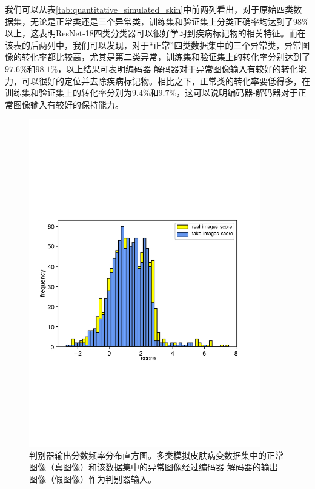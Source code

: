 我们可以从表\ref{tab:quantitative_simulated_skin}中前两列看出，对于原始四类数据集，无论是正常类还是三个异常类，训练集和验证集上分类正确率均达到了$98\%$以上，这表明ResNet-18四类分类器可以很好学习到疾病标记物的相关特征。而在该表的后两列中，我们可以发现，对于“正常”四类数据集中的三个异常类，异常图像的转化率都比较高，尤其是第二类异常，训练集和验证集上的转化率分别达到了$97.6\%$和$98.1\%$，以上结果可表明编码器-解码器对于异常图像输入有较好的转化能力，可以很好的定位并去除疾病标记物。相比之下，正常类的转化率要低得多，在训练集和验证集上的转化率分别为$9.4\%$和$9.7\%$，这可以说明编码器-解码器对于正常图像输入有较好的保持能力。
\begin{figure}[h]
	\centering
	\includegraphics[width=0.9\textwidth]{figure/simulated_skin_score_distribution.pdf}
	\caption[判别器输出分数频率分布直方图]{判别器输出分数频率分布直方图。多类模拟皮肤病变数据集中的正常图像（真图像）和该数据集中的异常图像经过编码器-解码器的输出图像（假图像）作为判别器输入。}
	\label{fig:simulated_skin_hist_freq}
\end{figure}

